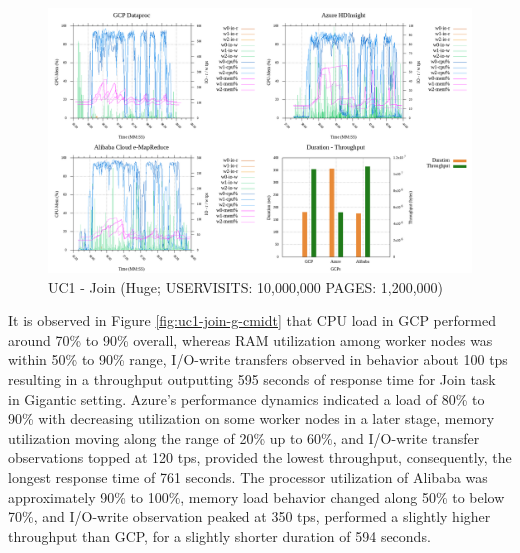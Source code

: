 \documentclass[review]{elsarticle}
\begin{document}
\begin{figure}[p]
	\caption{UC1 - Join (Huge; USERVISITS: 10,000,000 PAGES: 1,200,000)}
	\label{fig:uc1-join-h-cmidt}
	\includegraphics[width=\textwidth]{uc1-join-h-cmidt}
	\centering
\end{figure}

It is observed in Figure \ref{fig:uc1-join-g-cmidt} that CPU load in GCP performed around 70\% to 90\% overall, whereas RAM utilization among worker nodes was within 50\% to 90\% range, I/O-write transfers observed in behavior about 100 tps resulting in a throughput outputting 595 seconds of response time for Join task in Gigantic setting. Azure's performance dynamics indicated a load of 80\% to 90\% with decreasing utilization on some worker nodes in a later stage, memory utilization moving along the range of 20\% up to 60\%, and I/O-write transfer observations topped at 120 tps, provided the lowest throughput, consequently, the longest response time of 761 seconds.  The processor utilization of Alibaba was approximately 90\% to 100\%, memory load behavior changed along 50\% to below 70\%, and I/O-write observation peaked at 350 tps, performed a slightly higher throughput than GCP, for a slightly shorter duration of 594 seconds.
\end{document}

